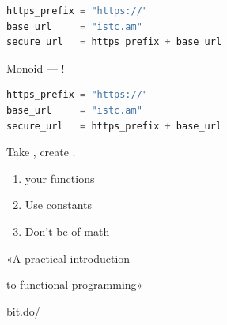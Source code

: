 \documentclass[aspectratio=169]{beamer}
\begin{document}
\begin{frame}[fragile,t]
    \begin{lstlisting}[language=Python]
https_prefix = "https://"
base_url     = "istc.am"
secure_url   = https_prefix + base_url
    \end{lstlisting}

    \vspace{2em}

    \centering
        \Huge
            Monoid --- !
\end{frame}

\begin{frame}[fragile,t]
    \begin{lstlisting}[language=Python]
https_prefix = "https://"
base_url     = "istc.am"
secure_url   = https_prefix + base_url
    \end{lstlisting}

    \vspace{2em}

    \centering
        \Huge
            Take , create .
\end{frame}

\begin{frame}
    \centering
\end{frame}

\begin{frame}
    \centering
\end{frame}

\begin{frame}
    \Huge
        \begin{enumerate}[ leftmargin=1.5em
                         , itemsep=1em
                         , labelsep=0.5em
                         , label=\color{darkelectricblue}\Roman*
                         ]
            \item {} your functions
            \item Use  constants
            \item Don't be  of math
        \end{enumerate}
\end{frame}

\begin{frame}
    \centering
\end{frame}

\begin{frame}
    \Huge{«A practical introduction}

    \Huge{\hspace{0.59em}to functional programming»}

    \vspace{1em}

    \Huge{bit.do/}
\end{frame}
\end{document}
